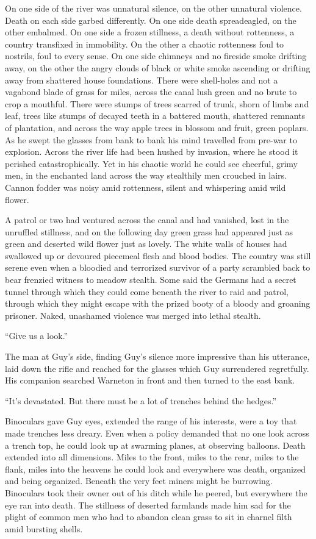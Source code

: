 On one side of the river was unnatural silence, on the other unnatural violence. Death on each side garbed differently. On one side death spreadeagled, on the other embalmed. On one side a frozen stillness, a death without rottenness, a country transfixed in immobility. On the other a chaotic rottenness foul to nostrils, foul to every sense. On one side chimneys and no fireside smoke drifting away, on the other the angry clouds of black or white smoke ascending or drifting away from shattered house foundations. There were shell-holes and not a vagabond blade of grass for miles, across the canal lush green and no brute to crop a mouthful. There were stumps of trees scarred of trunk, shorn of limbs and leaf, trees like stumps of decayed teeth in a battered mouth, shattered remnants of plantation, and across the way apple trees in blossom and fruit, green poplars. As he swept the glasses from bank to bank his mind travelled from pre-war to explosion. Across the river life had been hushed by invasion, where he stood it perished catastrophically. Yet in his chaotic world he could see cheerful, grimy men, in the enchanted land across the way stealthily men crouched in lairs. Cannon fodder was noisy amid rottenness, silent and whispering amid wild flower.

A patrol or two had ventured across the canal and had vanished, lost in the unruffled stillness, and on the following day green grass had appeared just as green and deserted wild flower just as lovely. The white walls of houses had swallowed up or devoured piecemeal flesh and blood bodies. The country was still serene even when a bloodied and terrorized survivor of a party scrambled back to bear frenzied witness to meadow stealth. Some said the Germans had a secret tunnel through which they could come beneath the river to raid and patrol, through which they might escape with the prized booty of a bloody and groaning prisoner. Naked, unashamed violence was merged into lethal stealth.

``Give us a look.''

The man at Guy's side, finding Guy's silence more impressive than his utterance, laid down the rifle and reached for the glasses which Guy surrendered regretfully. His companion searched Warneton in front and then turned to the east bank.

``It's devastated. But there must be a lot of trenches behind the hedges.''

Binoculars gave Guy eyes, extended the range of his interests, were a toy that made trenches less dreary. Even when a policy demanded that no one look across a trench top, he could look up at swarming planes, at observing balloons. Death extended into all dimensions. Miles to the front, miles to the rear, miles to the flank, miles into the heavens he could look and everywhere was death, organized and being organized. Beneath the very feet miners might be burrowing. Binoculars took their owner out of his ditch while he peered, but everywhere the eye ran into death. The stillness of deserted farmlands made him sad for the plight of common men who had to abandon clean grass to sit in charnel filth amid bursting shells.

